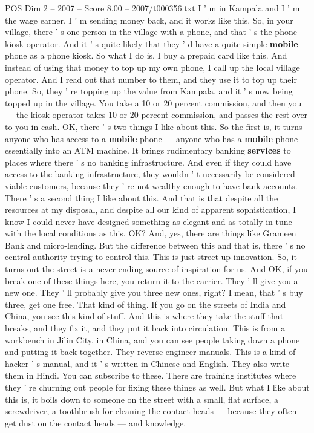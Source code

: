 \begin{textsample}{POS Dim 2 – 2007 – Score 8.00 – 2007/t000356.txt}
I ' m in Kampala and I ' m the wage earner.
I ' m sending money back, and it works like this.
So, in your village, there ' s one person in the village with a phone, and that ' s the phone kiosk operator.
And it ' s quite likely that they ' d have a quite simple \textbf{mobile} phone as a phone kiosk.
So what I do is, I buy a prepaid card like this.
And instead of using that money to top up my own phone, I call up the local village operator.
And I read out that number to them, and they use it to top up their phone.
So, they ' re topping up the value from Kampala, and it ' s now being topped up in the village.
You take a 10 or 20 percent commission, and then you — the kiosk operator takes 10 or 20 percent commission, and passes the rest over to you in cash.
OK, there ' s two things I like about this.
So the first is, it turns anyone who has access to a \textbf{mobile} phone — anyone who has a \textbf{mobile} phone — essentially into an ATM machine.
It brings rudimentary banking \textbf{services} to places where there ' s no banking infrastructure.
And even if they could have access to the banking infrastructure, they wouldn ' t necessarily be considered viable customers, because they ' re not wealthy enough to have bank accounts.
There ' s a second thing I like about this.
And that is that despite all the resources at my disposal, and despite all our kind of apparent sophistication, I know I could never have designed something as elegant and as totally in tune with the local conditions as this.
OK?
And, yes, there are things like Grameen Bank and micro-lending.
But the difference between this and that is, there ' s no central authority trying to control this.
This is just street-up innovation.
So, it turns out the street is a never-ending source of inspiration for us.
And OK, if you break one of these things here, you return it to the carrier.
They ' ll give you a new one.
They ' ll probably give you three new ones, right?
I mean, that ' s buy three, get one free.
That kind of thing.
If you go on the streets of India and China, you see this kind of stuff.
And this is where they take the stuff that breaks, and they fix it, and they put it back into circulation.
This is from a workbench in Jilin City, in China, and you can see people taking down a phone and putting it back together.
They reverse-engineer manuals.
This is a kind of hacker ' s manual, and it ' s written in Chinese and English.
They also write them in Hindi.
You can subscribe to these.
There are training institutes where they ' re churning out people for fixing these things as well.
But what I like about this is, it boils down to someone on the street with a small, flat surface, a screwdriver, a toothbrush for cleaning the contact heads — because they often get dust on the contact heads — and knowledge.

\end{textsample}
